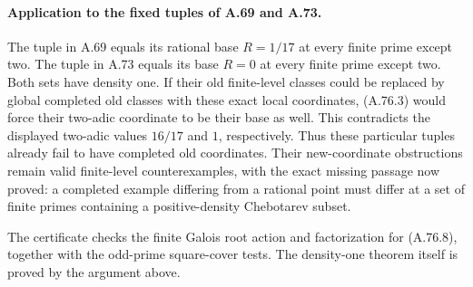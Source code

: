 \paragraph{Application to the fixed tuples of A.69 and A.73.}
The tuple in A.69 equals its rational base $R=1/17$ at every
finite prime except two.  The tuple in A.73 equals its base
$R=0$ at every finite prime except two.  Both sets have
density one.  If their old finite-level classes could be
replaced by global completed old classes with these exact
local coordinates, (A.76.3) would force their two-adic
coordinate to be their base as well.  This contradicts the
displayed two-adic values $16/17$ and $1$, respectively.
Thus these particular tuples already fail to have completed
old coordinates.  Their new-coordinate obstructions remain
valid finite-level counterexamples, with the exact missing
passage now proved: a completed example differing from a
rational point must differ at a set of finite primes
containing a positive-density Chebotarev subset.

The certificate 
checks the finite Galois root action and factorization for
(A.76.8), together with the odd-prime square-cover tests.
The density-one theorem itself is proved by the argument above.
